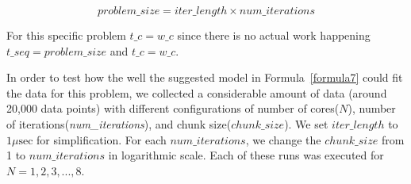 \begin{equation}\label{problem_size}
problem\_size = iter\_length\times{num\_iterations}
\end{equation}

For this specific problem $t\_c=w\_c$ since there is no actual work happening  $t\_{seq}=problem\_{size}$ and $t\_c=w\_c$.
 
In order to test how the well the suggested model in Formula~\ref{formula7} could fit the data for this problem, we collected a considerable amount of data (around 20,000 data points) with different configurations of number of cores($N$), number of iterations(\emph{num\_{iterations}}), and chunk size($chunk\_{size}$). We set $iter\_{length}$ to $1\mu\text{sec}$ for simplification. For each $num\_{iterations}$, we change the $chunk\_{size}$ from 1 to $num\_{iterations}$ in logarithmic scale. Each of these runs was executed for $N=1,2,3,...,8$.  

